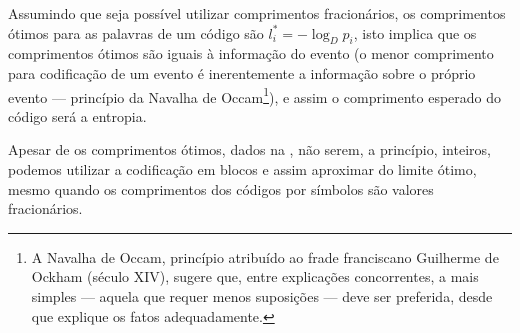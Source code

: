 Assumindo que seja possível utilizar comprimentos fracionários, os comprimentos
ótimos para as palavras de um código são $l^\ast_i = - \log_D p_i$, isto
implica que os comprimentos ótimos são iguais à informação do evento (o menor
comprimento para codificação de um evento é inerentemente a informação sobre o
próprio evento --- princípio da Navalha de Occam\footnote{
A Navalha de Occam, princípio atribuído ao frade franciscano Guilherme de Ockham 
(século XIV), sugere que, entre explicações concorrentes, a mais simples --- 
aquela que requer menos suposições --- deve ser preferida, desde que explique os 
fatos adequadamente. 
}), e assim o comprimento
esperado do código será a entropia.

Apesar de os comprimentos ótimos, dados na , não serem, a princípio,
inteiros, podemos utilizar a codificação em blocos e assim aproximar do limite
ótimo, mesmo quando os comprimentos dos códigos por símbolos são valores fracionários.

